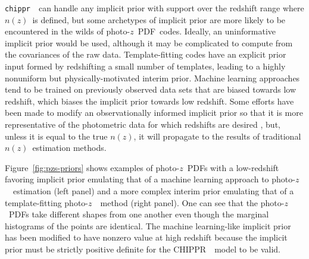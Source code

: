 \documentclass[iop]{emulateapj}
\newcommand{\Fig}[1]{Figure~\ref{#1}}
\newcommand{\project}[1]{{\textsc{#1}}~}
\newcommand{\Chippr}{\project{CHIPPR}}
\newcommand{\repo}[1]{{\texttt{#1}}~}
\newcommand{\chippr}{\repo{chippr}}
\newcommand{\nz}{$n(z)$}
\newcommand{\pz}{photo-$z$~}
\newcommand{\pzpdf}{\pz PDF}
\begin{document}
\chippr\ can handle any implicit prior with support over the redshift range 
where \nz\ is defined, but some archetypes of implicit prior are more likely to 
be encountered in the wilds of \pzpdf\ codes.
Ideally, an uninformative implicit prior would be used, although it may be 
complicated to compute from the covariances of the raw data.  
Template-fitting codes have an explicit prior input formed by redshifting a 
small number of templates, leading to a highly nonuniform but 
physically-motivated interim prior.
Machine learning approaches tend to be trained on previously observed data sets 
that are biased towards low redshift, which biases the implicit prior towards 
low redshift.
Some efforts have been made to modify an observationally informed implicit 
prior so that it is more representative of the photometric data for which 
redshifts are desired \citep{sheldon_photometric_2012}, but, unless it is equal 
to the true \nz, it will propagate to the results of traditional \nz\ 
estimation methods.  

\Fig{fig:pzs-priors} shows examples of \pzpdf s with a low-redshift favoring 
implicit prior emulating that of a machine learning approach to \pz\ estimation 
(left panel) and a more complex interim prior emulating that of a 
template-fitting \pz\ method (right panel).
One can see that the \pzpdf s take different shapes from one another even 
though the marginal histograms of the points are identical.
The machine learning-like implicit prior has been modified to have nonzero 
value at high redshift because the implicit prior must be strictly positive 
definite for the \Chippr\ model to be valid.
\end{document}
